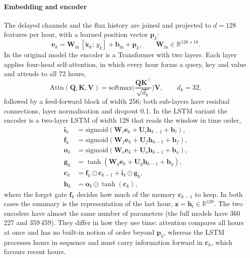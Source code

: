 \documentclass[a4paper,fleqn]{cas-dc}
\begin{document}
\paragraph{Embedding and encoder} The delayed channels and the flux history are joined and projected to
\(d=128\) features per hour, with a learned position vector \(\mathbf p_k\):
\begin{equation}
\mathbf e_k=\mathbf W_{\mathrm{in}}\,[\tilde{\mathbf x}_k;\,y_k]+\mathbf b_{\mathrm{in}}+\mathbf p_k,\qquad
\mathbf W_{\mathrm{in}}\in\mathbb R^{128\times18}. \label{eq:embed}
\end{equation}
In the original model the encoder is a Transformer \citep{vaswani2017} with two layers. Each layer applies
four-head self-attention, in which every hour forms a query, key and value and attends to all 72 hours,
\begin{equation}
\mathrm{Attn}(\mathbf Q,\mathbf K,\mathbf V)=\mathrm{softmax}\!\Big(\frac{\mathbf Q\mathbf K^{\top}}{\sqrt{d_k}}\Big)\mathbf V,
\qquad d_k=32, \label{eq:attn}
\end{equation}
followed by a feed-forward block of width 256; both sub-layers have residual connections, layer normalisation
and dropout 0.1. In the LSTM variant the encoder is a two-layer LSTM \citep{hochreiter1997} of width 128 that reads
the window in time order,
\begin{equation}
\begin{aligned}
\mathbf i_k&=\mathrm{sigmoid}(\mathbf W_i\mathbf e_k+\mathbf U_i\mathbf h_{k-1}+\mathbf b_i),\\
\mathbf f_k&=\mathrm{sigmoid}(\mathbf W_f\mathbf e_k+\mathbf U_f\mathbf h_{k-1}+\mathbf b_f),\\
\mathbf o_k&=\mathrm{sigmoid}(\mathbf W_o\mathbf e_k+\mathbf U_o\mathbf h_{k-1}+\mathbf b_o),\\
\mathbf g_k&=\tanh(\mathbf W_g\mathbf e_k+\mathbf U_g\mathbf h_{k-1}+\mathbf b_g),\\
\mathbf c_k&=\mathbf f_k\odot\mathbf c_{k-1}+\mathbf i_k\odot\mathbf g_k,\\
\mathbf h_k&=\mathbf o_k\odot\tanh(\mathbf c_k),
\end{aligned} \label{eq:lstm}
\end{equation}
where the forget gate \(\mathbf f_k\) decides how much of the memory \(\mathbf c_{k-1}\) to keep. In both cases the
summary is the representation of the last hour, \(\mathbf z=\mathbf h_t\in\mathbb R^{128}\). The two encoders have
almost the same number of parameters (the full models have 360\,227 and 359\,459). They differ in how they use
time: attention compares all hours at once and has no built-in notion of order beyond \(\mathbf p_k\), whereas the
LSTM processes hours in sequence and must carry information forward in \(\mathbf c_k\), which favours recent
hours.
\end{document}
